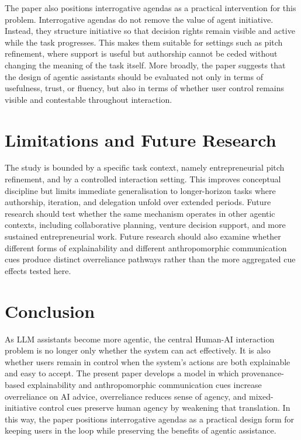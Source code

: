 \documentclass[sigconf,review,anonymous]{acmart}
\begin{document}
The paper also positions interrogative agendas as a practical intervention for this problem. Interrogative agendas do not remove the value of agent initiative. Instead, they structure initiative so that decision rights remain visible and active while the task progresses. This makes them suitable for settings such as pitch refinement, where support is useful but authorship cannot be ceded without changing the meaning of the task itself. More broadly, the paper suggests that the design of agentic assistants should be evaluated not only in terms of usefulness, trust, or fluency, but also in terms of whether user control remains visible and contestable throughout interaction.

\section{Limitations and Future Research}

The study is bounded by a specific task context, namely entrepreneurial pitch refinement, and by a controlled interaction setting. This improves conceptual discipline but limits immediate generalisation to longer-horizon tasks where authorship, iteration, and delegation unfold over extended periods. Future research should test whether the same mechanism operates in other agentic contexts, including collaborative planning, venture decision support, and more sustained entrepreneurial work. Future research should also examine whether different forms of explainability and different anthropomorphic communication cues produce distinct overreliance pathways rather than the more aggregated cue effects tested here.

\section{Conclusion}

As LLM assistants become more agentic, the central Human-AI interaction problem is no longer only whether the system can act effectively. It is also whether users remain in control when the system’s actions are both explainable and easy to accept. The present paper develops a model in which provenance-based explainability and anthropomorphic communication cues increase overreliance on AI advice, overreliance reduces sense of agency, and mixed-initiative control cues preserve human agency by weakening that translation. In this way, the paper positions interrogative agendas as a practical design form for keeping users in the loop while preserving the benefits of agentic assistance.

\begin{acks}
\end{acks}





\appendix
\end{document}
